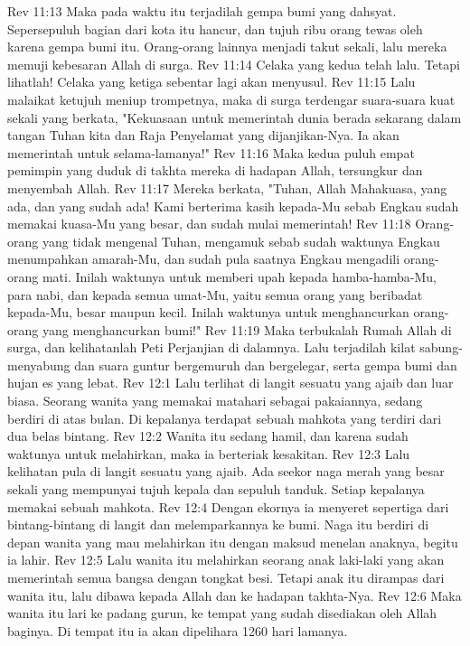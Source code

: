 Rev 11:13  Maka pada waktu itu terjadilah gempa bumi yang dahsyat. Sepersepuluh bagian dari kota itu hancur, dan tujuh ribu orang tewas oleh karena gempa bumi itu. Orang-orang lainnya menjadi takut sekali, lalu mereka memuji kebesaran Allah di surga.
Rev 11:14  Celaka yang kedua telah lalu. Tetapi lihatlah! Celaka yang ketiga sebentar lagi akan menyusul.
Rev 11:15  Lalu malaikat ketujuh meniup trompetnya, maka di surga terdengar suara-suara kuat sekali yang berkata, "Kekuasaan untuk memerintah dunia berada sekarang dalam tangan Tuhan kita dan Raja Penyelamat yang dijanjikan-Nya. Ia akan memerintah untuk selama-lamanya!"
Rev 11:16  Maka kedua puluh empat pemimpin yang duduk di takhta mereka di hadapan Allah, tersungkur dan menyembah Allah.
Rev 11:17  Mereka berkata, "Tuhan, Allah Mahakuasa, yang ada, dan yang sudah ada! Kami berterima kasih kepada-Mu sebab Engkau sudah memakai kuasa-Mu yang besar, dan sudah mulai memerintah!
Rev 11:18  Orang-orang yang tidak mengenal Tuhan, mengamuk sebab sudah waktunya Engkau menumpahkan amarah-Mu, dan sudah pula saatnya Engkau mengadili orang-orang mati. Inilah waktunya untuk memberi upah kepada hamba-hamba-Mu, para nabi, dan kepada semua umat-Mu, yaitu semua orang yang beribadat kepada-Mu, besar maupun kecil. Inilah waktunya untuk menghancurkan orang-orang yang menghancurkan bumi!"
Rev 11:19  Maka terbukalah Rumah Allah di surga, dan kelihatanlah Peti Perjanjian di dalamnya. Lalu terjadilah kilat sabung-menyabung dan suara guntur bergemuruh dan bergelegar, serta gempa bumi dan hujan es yang lebat.
Rev 12:1  Lalu terlihat di langit sesuatu yang ajaib dan luar biasa. Seorang wanita yang memakai matahari sebagai pakaiannya, sedang berdiri di atas bulan. Di kepalanya terdapat sebuah mahkota yang terdiri dari dua belas bintang.
Rev 12:2  Wanita itu sedang hamil, dan karena sudah waktunya untuk melahirkan, maka ia berteriak kesakitan.
Rev 12:3  Lalu kelihatan pula di langit sesuatu yang ajaib. Ada seekor naga merah yang besar sekali yang mempunyai tujuh kepala dan sepuluh tanduk. Setiap kepalanya memakai sebuah mahkota.
Rev 12:4  Dengan ekornya ia menyeret sepertiga dari bintang-bintang di langit dan melemparkannya ke bumi. Naga itu berdiri di depan wanita yang mau melahirkan itu dengan maksud menelan anaknya, begitu ia lahir.
Rev 12:5  Lalu wanita itu melahirkan seorang anak laki-laki yang akan memerintah semua bangsa dengan tongkat besi. Tetapi anak itu dirampas dari wanita itu, lalu dibawa kepada Allah dan ke hadapan takhta-Nya.
Rev 12:6  Maka wanita itu lari ke padang gurun, ke tempat yang sudah disediakan oleh Allah baginya. Di tempat itu ia akan dipelihara 1260 hari lamanya.
